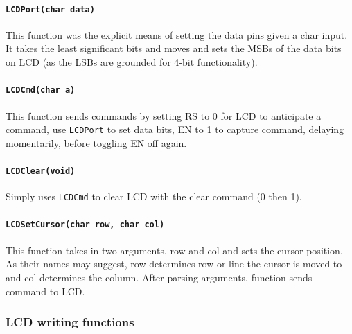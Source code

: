 \documentclass{article}
\begin{document}
\paragraph{\texttt{LCD\textunderscore Port(char data)}} This function was the explicit means of setting the data pins given a char input. It takes the least significant bits and moves and sets the MSBs of the data bits on LCD (as the LSBs are grounded for 4-bit functionality).
\paragraph{\texttt{LCD\textunderscore Cmd(char a)}} This function sends commands by setting RS to 0 for LCD to anticipate a command, use \texttt{LCD\textunderscore Port} to set data bits, EN to 1 to capture command, delaying momentarily, before toggling EN off again.
\paragraph{\texttt{LCD\textunderscore Clear(void)}}
Simply uses \texttt{LCD\textunderscore Cmd} to clear LCD with the clear command (0 then 1).
\paragraph{\texttt{LCD\textunderscore Set\textunderscore Cursor(char row, char col)}} This function takes in two arguments, row and col and sets the cursor position. As their names may suggest, row determines row or line the cursor is moved to and col determines the column. After parsing arguments, function sends command to LCD.

\subsubsection{LCD writing functions}
\end{document}
